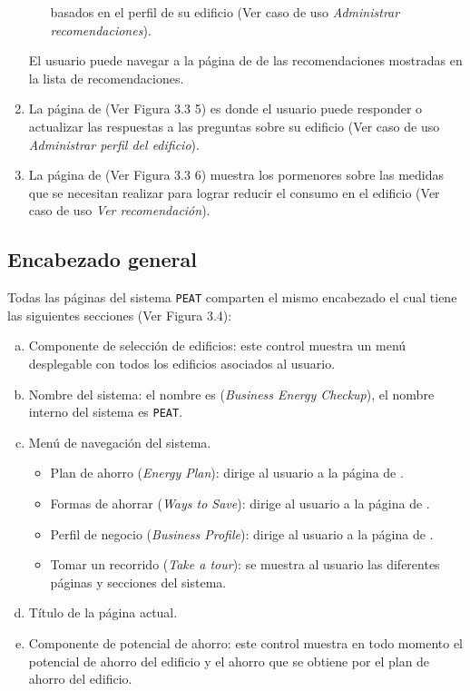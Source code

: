 \begin{enumerate}
\begin{itemize}
    basados en el perfil de su edificio (Ver caso de uso \textit{Administrar
      recomendaciones}).
  \end{itemize}
  El usuario puede navegar a la página de 
  de las recomendaciones mostradas en la lista de recomendaciones.
\item La página de  (Ver Figura 3.3 5) es
  donde el usuario puede responder o actualizar las respuestas a las preguntas
  sobre su edificio (Ver caso de uso \textit{Administrar perfil del edificio}).
\item La página de  (Ver Figura 3.3 6) muestra
  los pormenores sobre las medidas que se necesitan realizar para lograr reducir
  el consumo en el edificio (Ver caso de uso \textit{Ver recomendación}).
\end{enumerate}


\subsection{Encabezado general}

Todas las páginas del sistema \texttt{PEAT} comparten el mismo encabezado
el cual tiene las siguientes secciones (Ver Figura 3.4):

\begin{enumerate}[a)]
\item Componente de selección de edificios: este control muestra un menú
  desplegable con todos los edificios asociados al usuario.
\item Nombre del sistema: el nombre es 
  (\textit{Business Energy Checkup}), el nombre interno del sistema es \texttt{PEAT}.
\item Menú de navegación del sistema.
  \begin{itemize}
  \item Plan de ahorro (\textit{Energy Plan}): dirige al usuario a la página de
    .
  \item Formas de ahorrar (\textit{Ways to Save}): dirige al usuario a la página de
    .
  \item Perfil de negocio (\textit{Business Profile}): dirige al usuario a la página
    de .
  \item Tomar un recorrido (\textit{Take a tour}): se muestra al usuario
    las diferentes páginas y secciones del sistema.
  \end{itemize}
\item Título de la página actual.
\item Componente de potencial de ahorro: este control muestra en todo momento
  el potencial de ahorro del edificio y el ahorro que se obtiene por el plan
  de ahorro del edificio.
\end{enumerate}

